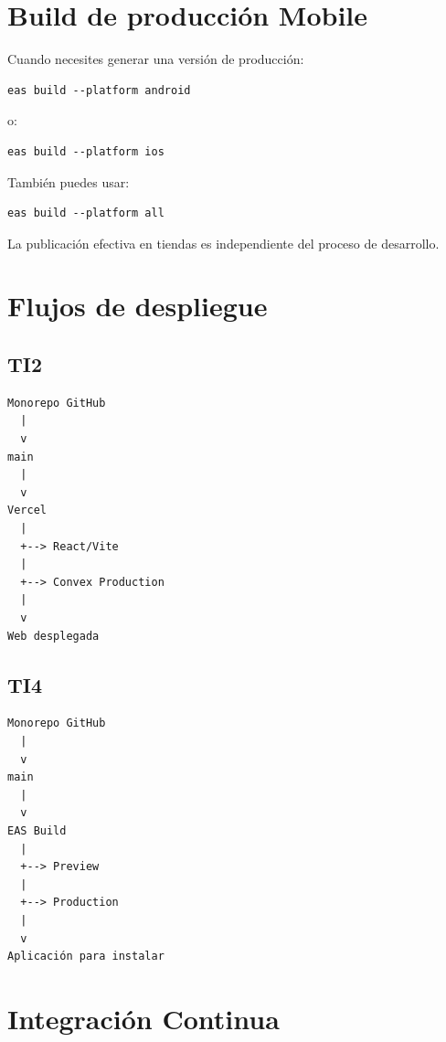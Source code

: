 \documentclass[11pt,a4paper]{article}
\begin{document}
\section{Build de producción Mobile}

Cuando necesites generar una versión de producción:

\begin{lstlisting}
eas build --platform android
\end{lstlisting}

o:

\begin{lstlisting}
eas build --platform ios
\end{lstlisting}

También puedes usar:

\begin{lstlisting}
eas build --platform all
\end{lstlisting}

La publicación efectiva en tiendas es independiente del proceso de desarrollo.

\section{Flujos de despliegue}

\subsection{TI2}

\begin{lstlisting}
Monorepo GitHub
  |
  v
main
  |
  v
Vercel
  |
  +--> React/Vite
  |
  +--> Convex Production
  |
  v
Web desplegada
\end{lstlisting}

\subsection{TI4}

\begin{lstlisting}
Monorepo GitHub
  |
  v
main
  |
  v
EAS Build
  |
  +--> Preview
  |
  +--> Production
  |
  v
Aplicación para instalar
\end{lstlisting}

\section{Integración Continua}
\end{document}
